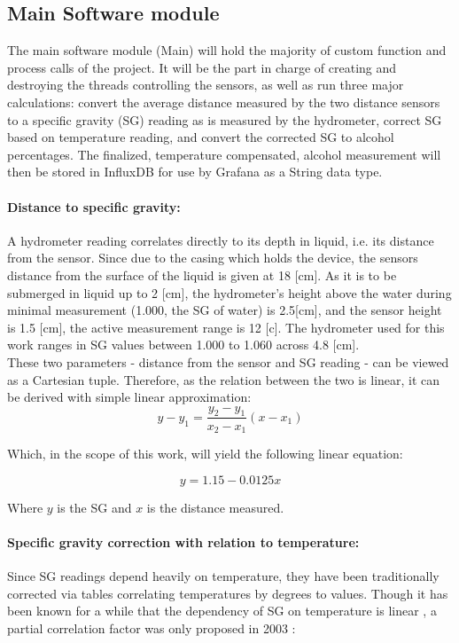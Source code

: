 \documentclass[twoside]{ctuthesis}
\theoremstyle{plain}
\theoremstyle{definition}
\theoremstyle{note}
\begin{document}
\subsection{Main Software module}
The main software module (Main) will hold the majority of custom function and process calls of the project. It will be the part in charge of creating and destroying the threads controlling the sensors, as well as run three major calculations: convert the average distance measured by the two distance sensors to a specific gravity (SG) reading as is measured by the hydrometer, correct SG based on temperature reading, and convert the corrected SG to alcohol percentages. The finalized, temperature compensated, alcohol measurement will then be stored in InfluxDB for use by Grafana as a String data type.

\paragraph{Distance to specific gravity:}
A hydrometer reading correlates directly to its depth in liquid, i.e. its distance from the sensor. Since due to the casing which holds the device, the sensors distance from the surface of the liquid is given at 18 [cm]. As it is to be submerged in liquid up to 2 [cm], the hydrometer's height above the water during minimal measurement (1.000, the SG of water) is 2.5[cm], and the sensor height is 1.5 [cm], the active measurement range is 12 [c]. The hydrometer used for this work ranges in SG values between 1.000 to 1.060 across 4.8 [cm].\\
These two parameters - distance from the sensor and SG reading - can be viewed as a Cartesian tuple. Therefore, as the relation between the two is linear, it can be derived with simple linear approximation:
\begin{equation}
y-y_1 = \frac{y_2 - y_1}{x_2 - x_1}(x - x_1)
\end{equation}

Which, in the scope of this work, will yield the following linear equation:

\begin{equation}
	y = 1.15 - 0.0125 x
\end{equation}

Where $y$ is the SG and $x$ is the distance measured.\\

\paragraph{Specific gravity correction with relation to temperature:}
Since SG readings depend heavily on temperature, they have been traditionally corrected via tables correlating temperatures by degrees to values. Though it has been known for a while that the dependency of SG on temperature is linear \cite{Temp_To_SG}, a partial correlation factor was only proposed in 2003 \cite{Joy_Of_Brewing}:
\end{document}
